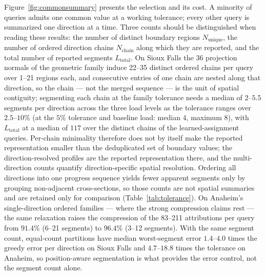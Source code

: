 Figure~\ref{fig:commonsummary} presents the selection and its cost. A
minority of queries admits one common value at a working tolerance;
every other query is summarized one direction at a time. Three counts
should be distinguished when reading these results: the number of
distinct boundary regions $N_{\mathrm{unique}}$, the number of ordered
direction chains $N_{\mathrm{chain}}$ along which they are reported,
and the total number of reported segments $L_{\mathrm{total}}$. On
Sioux Falls the 36 projection normals of the geometric family induce
22--35 distinct ordered chains per query over 1--21 regions each, and
consecutive entries of one chain are nested along that
direction, so the chain --- not the merged sequence --- is the unit of
spatial contiguity; segmenting each chain at the family tolerance
needs a median of $2$--$5.5$ segments per direction across the three
load levels as the tolerance ranges over $2.5$--$10\%$ (at the $5\%$
tolerance and baseline load: median $4$, maximum $8$), with
$L_{\mathrm{total}}$ at a median of $117$ over the distinct chains of
the learned-assignment queries. Per-chain minimality therefore does
not by itself make the reported representation smaller than the
deduplicated set of boundary values; the direction-resolved profiles
are the reported representation there, and the multi-direction counts
quantify direction-specific spatial resolution. Ordering all
directions into one progress sequence yields fewer apparent segments
only by grouping non-adjacent cross-sections, so those counts are not
spatial summaries and are retained only for comparison
(Table~\ref{tab:tolerance}). On Anaheim's single-direction ordered
families --- where the strong compression claims rest --- the same
relaxation raises the compression of the 83--211 attributions
per query from $91.4\%$ (6--21 segments) to $96.4\%$ (3--12
segments). With the same segment count, equal-count partitions have
median worst-segment error $1.4$--$4.0$ times the greedy error per
direction on Sioux Falls and $4.7$--$18.8$ times the tolerance on
Anaheim, so position-aware segmentation is what provides the error
control, not the segment count alone.

